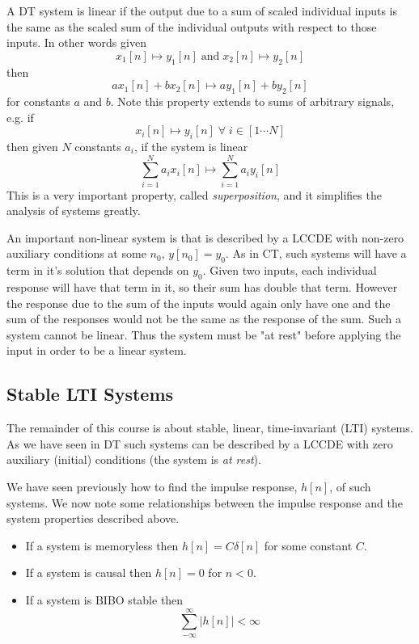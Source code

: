 A DT system is linear if the output due to a sum of scaled individual inputs is the same as the scaled sum of the individual outputs with respect to those inputs. In other words given
\[
x_1[n] \mapsto y_1[n] \;\text{and}\; x_2[n] \mapsto y_2[n]
\]
then
\[
a x_1[n] + b x_2[n] \mapsto a y_1[n] + b y_2[n]
\]
for constants $a$ and $b$.
Note this property extends to sums of arbitrary signals, e.g. if
\[
x_i[n] \mapsto y_i[n] \; \forall\; i \in [1 \cdots N]
\]
then given $N$ constants $a_i$, if the system is linear
\[
\sum\limits_{i = 1}^N a_i x_i[n] \mapsto \sum\limits_{i = 1}^N a_i y_i[n] 
\]
This is a very important property, called {\it superposition}, and it simplifies the analysis of systems greatly.

An important non-linear system is that is described by a LCCDE with non-zero auxiliary conditions at some $n_0$, $y[n_0] = y_0$. As in CT, such systems will have a term in it's solution that depends on $y_0$. Given two inputs, each individual response will have that term in it, so their sum has double that term. However the response due to the sum of the inputs would again only have one and the sum of the responses would not be the same as the response of the sum. Such a system cannot be linear. Thus the system must be "at rest" before applying the input in order to be a linear system.

\subsection{Stable LTI Systems}

The remainder of this course is about stable, linear, time-invariant (LTI) systems. As we have seen in DT such systems can be described by a LCCDE with zero auxiliary (initial) conditions (the system is \emph{at rest}). 

We have seen previously how to find the impulse response, $h[n]$, of such systems. We now note some relationships between the impulse response and the system properties described above.

\begin{itemize}
\item If a system is memoryless then $h[n] = C \delta[n]$ for some constant $C$.
\item If a system is causal then  $h[n] = 0$ for $n < 0$.
\item If a system is BIBO stable then
  \[
  \sum\limits_{-\infty}^{\infty} |h[n]| < \infty
  \]
\end{itemize}

